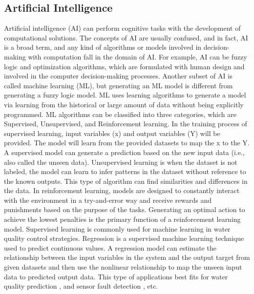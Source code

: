 \subsection{Artificial Intelligence}
Artificial intelligence (AI) can perform cognitive tasks with the development of computational solutions. The concepts of AI are usually confused, and in fact, AI is a broad term, and any kind of algorithms or models involved in decision-making with computation fall in the domain of AI. For example, AI can be fuzzy logic and optimization algorithms, which are formulated with human design and involved in the computer decision-making processes. Another subset of AI is called machine learning (ML), but generating an ML model is different from generating a fuzzy logic model. ML uses learning algorithms to generate a model via learning from the historical or large amount of data without being explicitly programmed. ML algorithms can be classified into three categories, which are Supervised, Unsupervised, and Reinforcement learning. In the training process of supervised learning, input variables (x) and output variables (Y) will be provided. The model will learn from the provided datasets to map the x to the Y. A supervised model can generate a prediction based on the new input data (i.e., also called the unseen data). Unsupervised learning is when the dataset is not labeled, the model can learn to infer patterns in the dataset without reference to the known outputs. This type of algorithm can find similarities and differences in the data. In reinforcement learning, models are designed to constantly interact with the environment in a try-and-error way and receive rewards and punishments based on the purpose of the tasks. Generating an optimal action to achieve the lowest penalties is the primary function of a reinforcement learning model. Supervised learning is commonly used for machine learning in water quality control strategies. Regression is a supervised machine learning technique used to predict continuous values. A regression model can estimate the relationship between the input variables in the system and the output target from given datasets and then use the nonlinear relationship to map the unseen input data to predicted output data. This type of applications best fits for water quality prediction  \citep{librantzArtificialNeuralNetworks2018}, and sensor fault detection \citep{cecconiSoftSensingOnLine2021}, etc.


